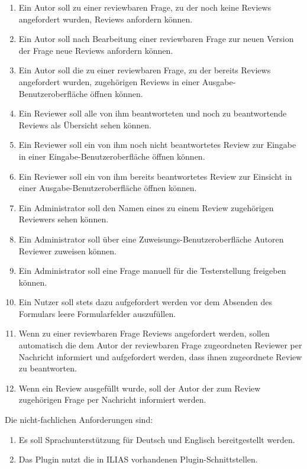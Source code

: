 \documentclass[a4paper]{scrreprt}
\begin{document}
\begin{enumerate}[label= FA \arabic*:]
\item Ein Autor soll zu einer reviewbaren Frage, zu der noch keine Reviews angefordert wurden, Reviews anfordern können.
\item Ein Autor soll nach Bearbeitung einer reviewbaren Frage zur neuen Version der Frage neue Reviews  anfordern können.
\item Ein Autor soll die zu einer reviewbaren Frage, zu der bereits Reviews angefordert wurden, zugehörigen Reviews in einer Ausgabe-Benutzeroberfläche öffnen können.
\item Ein Reviewer soll alle von ihm beantworteten und noch zu beantwortende Reviews als Übersicht sehen können.
\item Ein Reviewer soll ein von ihm noch nicht beantwortetes Review zur Eingabe in einer Eingabe-Benutzeroberfläche öffnen können.
\item Ein Reviewer soll ein von ihm bereits beantwortetes Review zur Einsicht in einer Ausgabe-Benutzeroberfläche öffnen können.
\item Ein Administrator soll den Namen eines zu einem Review zugehörigen Reviewers sehen können.
\item Ein Administrator soll über eine Zuweisungs-Benutzeroberfläche Autoren Reviewer zuweisen können.
\item Ein Administrator soll eine Frage manuell für die Testerstellung freigeben können.
\item Ein Nutzer soll stets dazu aufgefordert werden vor dem Absenden des Formulars leere Formularfelder auszufüllen.  
\item Wenn zu einer reviewbaren Frage Reviews angefordert werden, sollen automatisch die dem Autor der reviewbaren Frage zugeordneten Reviewer per Nachricht informiert und aufgefordert werden, dass ihnen zugeordnete Review zu beantworten.
\item Wenn ein Review ausgefüllt wurde, soll der Autor der zum Review zugehörigen Frage per Nachricht informiert werden.
\end{enumerate}


Die nicht-fachlichen Anforderungen sind:
\begin{enumerate}[label=NFA \arabic*:]
\item Es soll Sprachunterstützung für Deutsch und Englisch bereitgestellt werden.
\item Das Plugin nutzt die in ILIAS vorhandenen Plugin-Schnittstellen.
\end{enumerate}
\end{document}
